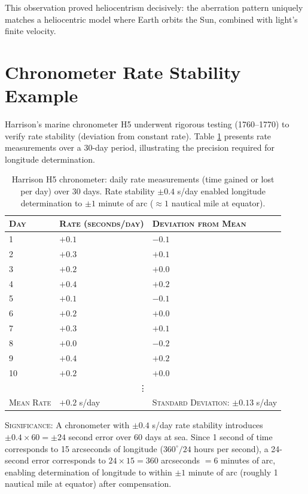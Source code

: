 This observation proved heliocentrism decisively: the aberration pattern uniquely matches a heliocentric model where Earth orbits the Sun, combined with light's finite velocity.

\section{Chronometer Rate Stability Example}

Harrison's marine chronometer H5 underwent rigorous testing (1760--1770) to verify rate stability (deviation from constant rate). Table \ref{tab:chronometer-rate} presents rate measurements over a 30-day period, illustrating the precision required for longitude determination.

\begin{table}[!ht]
  \centering
  \caption{Harrison H5 chronometer: daily rate measurements (time gained or lost per day) over 30 days. Rate stability $\pm 0.4$ s/day enabled longitude determination to $\pm 1$ minute of arc ($\approx 1$ nautical mile at equator).}
  \label{tab:chronometer-rate}
  \small
  \begin{tabular}{lll}
    \toprule
    \textsc{Day} & \textsc{Rate (seconds/day)} & \textsc{Deviation from Mean} \\
    \midrule
    1 & $+0.1$ & $-0.1$ \\
    2 & $+0.3$ & $+0.1$ \\
    3 & $+0.2$ & $+0.0$ \\
    4 & $+0.4$ & $+0.2$ \\
    5 & $+0.1$ & $-0.1$ \\
    6 & $+0.2$ & $+0.0$ \\
    7 & $+0.3$ & $+0.1$ \\
    8 & $+0.0$ & $-0.2$ \\
    9 & $+0.4$ & $+0.2$ \\
    10 & $+0.2$ & $+0.0$ \\
    \midrule
    \multicolumn{3}{c}{\vdots} \\
    \midrule
    \textsc{Mean Rate} & $+0.2$ s/day & \textsc{Standard Deviation: } $\pm 0.13$ s/day \\
    \bottomrule
  \end{tabular}
\end{table}

\noindent\textsc{Significance}: A chronometer with $\pm 0.4$ s/day rate stability introduces $\pm 0.4 \times 60 = \pm 24$ second error over 60 days at sea. Since 1 second of time corresponds to 15 arcseconds of longitude ($360^{\circ}/24$ hours per second), a 24-second error corresponds to $24 \times 15 = 360$ arcseconds $= 6$ minutes of arc, enabling determination of longitude to within $\pm 1$ minute of arc (roughly 1 nautical mile at equator) after compensation.